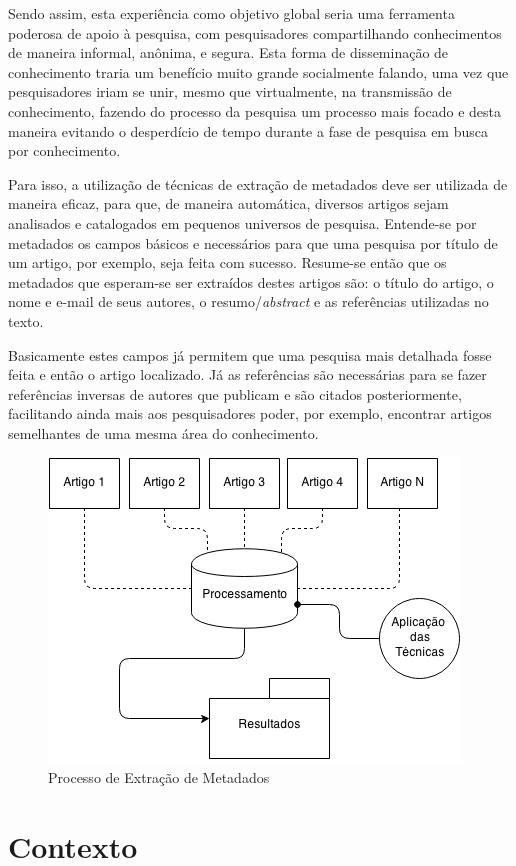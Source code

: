 Sendo assim, esta experiência como objetivo global seria uma ferramenta poderosa de apoio à pesquisa, com pesquisadores compartilhando conhecimentos de maneira informal, anônima, e segura. Esta forma de disseminação de conhecimento traria um benefício muito grande socialmente falando, uma vez que pesquisadores iriam se unir, mesmo que virtualmente, na transmissão de conhecimento, fazendo do processo da pesquisa um processo mais focado e desta maneira evitando o desperdício de tempo durante a fase de pesquisa em busca por conhecimento.

Para isso, a utilização de técnicas de extração de metadados deve ser utilizada de maneira eficaz, para que, de maneira automática, diversos artigos sejam analisados e catalogados em pequenos universos de pesquisa. Entende-se por metadados os campos básicos e necessários para que uma pesquisa por título de um artigo, por exemplo, seja feita com sucesso. Resume-se então que os metadados que esperam-se ser extraídos destes artigos são: o título do artigo, o nome e e-mail de seus autores, o resumo/\textit{abstract} e as referências utilizadas no texto.

Basicamente estes campos já permitem que uma pesquisa mais detalhada fosse feita e então o artigo localizado. Já as referências são necessárias para se fazer referências inversas de autores que publicam e são citados posteriormente, facilitando ainda mais aos pesquisadores poder, por exemplo, encontrar artigos semelhantes de uma mesma área do conhecimento.

\begin{figure}
	\centering
	\caption{Processo de Extração de Metadados}
	\label{fig:introduction}
	\includegraphics[width=0.7\linewidth]{./assets/images/introduction}
\end{figure}

\section{Contexto}
\label{sec:context}

